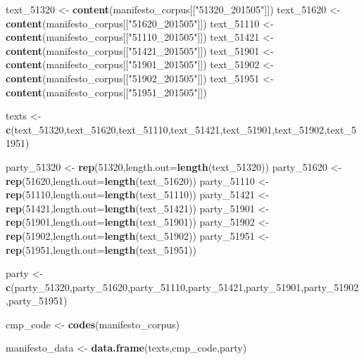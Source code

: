 \documentclass[
]{book}
\newenvironment{Shaded}{\begin{snugshade}}{\end{snugshade}}
\newcommand{\AttributeTok}[1]{\textcolor[rgb]{0.13,0.29,0.53}{#1}}
\newcommand{\DecValTok}[1]{\textcolor[rgb]{0.00,0.00,0.81}{#1}}
\newcommand{\FunctionTok}[1]{\textcolor[rgb]{0.13,0.29,0.53}{\textbf{#1}}}
\newcommand{\NormalTok}[1]{#1}
\newcommand{\OtherTok}[1]{\textcolor[rgb]{0.56,0.35,0.01}{#1}}
\newcommand{\StringTok}[1]{\textcolor[rgb]{0.31,0.60,0.02}{#1}}
\begin{document}
\begin{Shaded}
\begin{Highlighting}[]
\NormalTok{text\_51320 }\OtherTok{\textless{}{-}} \FunctionTok{content}\NormalTok{(manifesto\_corpus[[}\StringTok{"51320\_201505"}\NormalTok{]])}
\NormalTok{text\_51620 }\OtherTok{\textless{}{-}} \FunctionTok{content}\NormalTok{(manifesto\_corpus[[}\StringTok{"51620\_201505"}\NormalTok{]])}
\NormalTok{text\_51110 }\OtherTok{\textless{}{-}} \FunctionTok{content}\NormalTok{(manifesto\_corpus[[}\StringTok{"51110\_201505"}\NormalTok{]])}
\NormalTok{text\_51421 }\OtherTok{\textless{}{-}} \FunctionTok{content}\NormalTok{(manifesto\_corpus[[}\StringTok{"51421\_201505"}\NormalTok{]])}
\NormalTok{text\_51901 }\OtherTok{\textless{}{-}} \FunctionTok{content}\NormalTok{(manifesto\_corpus[[}\StringTok{"51901\_201505"}\NormalTok{]])}
\NormalTok{text\_51902 }\OtherTok{\textless{}{-}} \FunctionTok{content}\NormalTok{(manifesto\_corpus[[}\StringTok{"51902\_201505"}\NormalTok{]])}
\NormalTok{text\_51951 }\OtherTok{\textless{}{-}} \FunctionTok{content}\NormalTok{(manifesto\_corpus[[}\StringTok{"51951\_201505"}\NormalTok{]])}

\NormalTok{texts }\OtherTok{\textless{}{-}} \FunctionTok{c}\NormalTok{(text\_51320,text\_51620,text\_51110,text\_51421,text\_51901,text\_51902,text\_51951)}

\NormalTok{party\_51320 }\OtherTok{\textless{}{-}} \FunctionTok{rep}\NormalTok{(}\DecValTok{51320}\NormalTok{,}\AttributeTok{length.out=}\FunctionTok{length}\NormalTok{(text\_51320))}
\NormalTok{party\_51620 }\OtherTok{\textless{}{-}} \FunctionTok{rep}\NormalTok{(}\DecValTok{51620}\NormalTok{,}\AttributeTok{length.out=}\FunctionTok{length}\NormalTok{(text\_51620))}
\NormalTok{party\_51110 }\OtherTok{\textless{}{-}} \FunctionTok{rep}\NormalTok{(}\DecValTok{51110}\NormalTok{,}\AttributeTok{length.out=}\FunctionTok{length}\NormalTok{(text\_51110))}
\NormalTok{party\_51421 }\OtherTok{\textless{}{-}} \FunctionTok{rep}\NormalTok{(}\DecValTok{51421}\NormalTok{,}\AttributeTok{length.out=}\FunctionTok{length}\NormalTok{(text\_51421))}
\NormalTok{party\_51901 }\OtherTok{\textless{}{-}} \FunctionTok{rep}\NormalTok{(}\DecValTok{51901}\NormalTok{,}\AttributeTok{length.out=}\FunctionTok{length}\NormalTok{(text\_51901))}
\NormalTok{party\_51902 }\OtherTok{\textless{}{-}} \FunctionTok{rep}\NormalTok{(}\DecValTok{51902}\NormalTok{,}\AttributeTok{length.out=}\FunctionTok{length}\NormalTok{(text\_51902))}
\NormalTok{party\_51951 }\OtherTok{\textless{}{-}} \FunctionTok{rep}\NormalTok{(}\DecValTok{51951}\NormalTok{,}\AttributeTok{length.out=}\FunctionTok{length}\NormalTok{(text\_51951))}

\NormalTok{party }\OtherTok{\textless{}{-}} \FunctionTok{c}\NormalTok{(party\_51320,party\_51620,party\_51110,party\_51421,party\_51901,party\_51902,party\_51951)}

\NormalTok{cmp\_code }\OtherTok{\textless{}{-}} \FunctionTok{codes}\NormalTok{(manifesto\_corpus)}

\NormalTok{manifesto\_data }\OtherTok{\textless{}{-}} \FunctionTok{data.frame}\NormalTok{(texts,cmp\_code,party)}
\end{Highlighting}
\end{Shaded}
\end{document}
